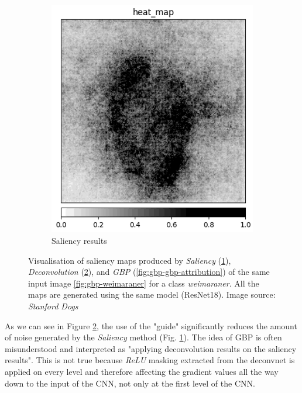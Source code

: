 \begin{figure}[h]
\begin{subfigure}{.25\textwidth}
    \includegraphics[width=\textwidth]{methods/images/1-4-0-rotation-30-Weimaraner-Weimaraner-saliency.png}
    \caption{Saliency results}\label{fig:gbp-saliency-attribution}
\end{subfigure}

 \caption{Visualisation of saliency maps produced by \textit{Saliency} (\ref{fig:gbp-saliency-attribution}), \textit{Deconvolution} (\ref{fig:gbp-comparision-with-deconv-and-saliency}), and \textit{GBP} (\ref{fig:gbp-gbp-attribution}) of the same input image \ref{fig:gbp-weimaraner} for a class \textit{weimaraner}. All the maps are generated using the same model (ResNet18). Image source: \textit{Stanford Dogs} \cite{stanford-dogs} }\label{fig:gbp-comparision-with-deconv-and-saliency}
\end{figure}

As we can see in Figure \ref{fig:gbp-comparision-with-deconv-and-saliency}, the use of the "guide" significantly reduces the amount of noise generated by the \textit{Saliency} method (Fig. \ref{fig:gbp-saliency-attribution}). The idea of GBP is often misunderstood and interpreted as "applying deconvolution results on the saliency results". This is not true because \textit{ReLU} masking extracted from the deconvnet is applied on every level and therefore affecting the gradient values all the way down to the input of the CNN, not only at the first level of the CNN. 